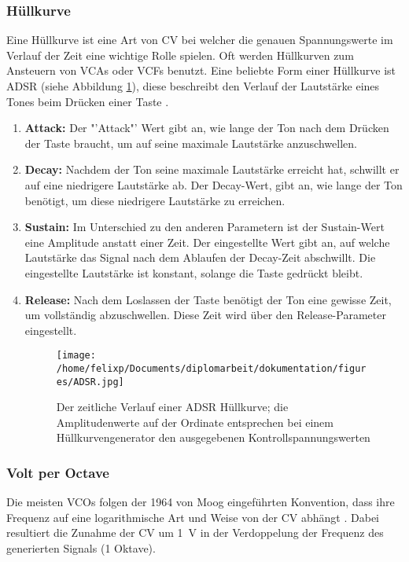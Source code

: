 \subsubsection{Hüllkurve}
\label{sec:org468f038}
Eine Hüllkurve ist eine Art von \acl{CV} bei welcher die genauen Spannungswerte im Verlauf der Zeit eine wichtige Rolle spielen. Oft werden Hüllkurven zum Ansteuern von \acp{VCA} oder \acp{VCF} benutzt. Eine beliebte Form einer Hüllkurve ist \ac{ADSR} (siehe Abbildung \ref{fig:org7fbb32d}), diese beschreibt den Verlauf der Lautstärke eines Tones beim Drücken einer Taste \cite{envelopes}.

\begin{enumerate}
\item \textbf{Attack:}
\label{sec:org837b092}
Der "'Attack"' Wert gibt an, wie lange der Ton nach dem Drücken der Taste braucht, um auf seine maximale Lautstärke anzuschwellen.

\item \textbf{Decay:}
\label{sec:org82aaeea}
Nachdem der Ton seine maximale Lautstärke erreicht hat, schwillt er auf eine niedrigere Lautstärke ab. Der Decay-Wert, gibt an, wie lange der Ton benötigt, um diese niedrigere Lautstärke zu erreichen.

\item \textbf{Sustain:}
\label{sec:orgb07f258}
Im Unterschied zu den anderen Parametern ist der Sustain-Wert eine Amplitude anstatt einer Zeit. Der eingestellte Wert gibt an, auf welche Lautstärke das Signal nach dem Ablaufen der Decay-Zeit abschwillt. Die eingestellte Lautstärke ist konstant, solange die Taste gedrückt bleibt.

\item \textbf{Release:}
\label{sec:org7026c94}
Nach dem Loslassen der Taste benötigt der Ton eine gewisse Zeit, um vollständig abzuschwellen.  Diese Zeit wird über den Release-Parameter eingestellt.

\begin{figure}[htbp]
\centering
\texttt{[image: /home/felixp/Documents/diplomarbeit/dokumentation/figures/ADSR.jpg]}
\caption{\label{fig:org7fbb32d}Der zeitliche Verlauf einer ADSR Hüllkurve; die Amplitudenwerte auf der Ordinate entsprechen bei einem Hüllkurvengenerator den ausgegebenen Kontrollspannungswerten  \cite{envelopes}}
\end{figure}
\end{enumerate}

\subsubsection{Volt per Octave}
\label{sec:org81a9d70}
Die meisten \acsp{VCO} folgen der 1964 von Moog eingeführten Konvention, dass ihre Frequenz auf eine logarithmische Art und Weise von der \acl{CV} abhängt \cite{moog1964}. Dabei resultiert die Zunahme der \acl{CV} um \SI{1}{\volt} in der Verdoppelung der Frequenz des generierten Signals (1 Oktave).

